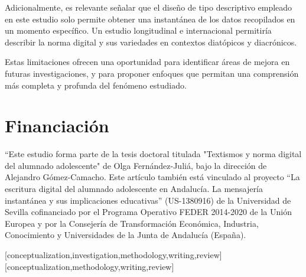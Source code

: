 \documentclass[spanish]{textolivre}
\begin{document}
Adicionalmente, es relevante señalar que el diseño de tipo descriptivo empleado en este estudio solo permite obtener una instantánea de los datos recopilados en un momento específico. Un estudio longitudinal e internacional permitiría describir la norma digital y sus variedades en contextos diatópicos y diacrónicos. 

Estas limitaciones ofrecen una oportunidad para identificar áreas de mejora en futuras investigaciones, y para proponer enfoques que permitan una comprensión más completa y profunda del fenómeno estudiado.

\section{Financiación}

“Este estudio forma parte de la tesis doctoral titulada "Textismos y norma digital del alumnado adolescente" de Olga Fernández-Juliá, bajo la dirección de Alejandro Gómez-Camacho. Este artículo también está vinculado al proyecto “La escritura digital del alumnado adolescente en Andalucía. La mensajería instantánea y sus implicaciones educativas” (US-1380916) de la Universidad de Sevilla cofinanciado por el Programa Operativo FEDER 2014-2020 de la Unión Europea y por la Consejería de Transformación Económica, Industria, Conocimiento y Universidades de la Junta de Andalucía (España).

\printbibliography\label{sec-bib}


\begin{contributors}
[conceptualization,investigation,methodology,writing,review]
[conceptualization,methodology,writing,review]
\end{contributors}
\end{document}
